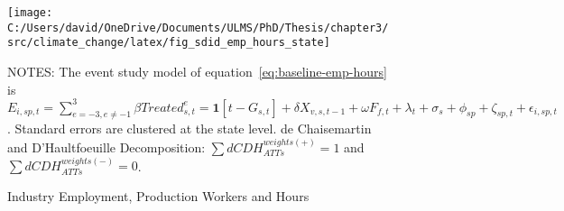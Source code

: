 \begin{figure}[H]
    \centering
    \texttt{[image: C:/Users/david/OneDrive/Documents/ULMS/PhD/Thesis/chapter3/src/climate\_change/latex/fig\_sdid\_emp\_hours\_state]}
    \caption{Industry Employment, Production Workers and Hours}
    \label{fig:state-baseline-employment-hours}
    \begin{minipage}{\columnwidth}
        \vspace{0.05in}
        \tiny NOTES: The event study model of equation~\ref{eq:baseline-emp-hours} is $E_{i,sp,t} = \sum_{{e = -3},{e \neq -1}}^{3} \beta Treated_{s,t}^e = \textbf{1}[t - G_{s,t}] + \delta X_{v,s,t-1} + \omega F_{f,t} + \lambda_{t} + \sigma_{s} + \phi_{sp} + \zeta_{sp,t} + \epsilon_{i,sp,t}$. Standard errors are clustered at the state level. de Chaisemartin and D'Haultfoeuille Decomposition: $\sum dCDH_{ATTs}^{weights(+)} = 1$ and $\sum dCDH_{ATTs}^{weights(-)} = 0$.
    \end{minipage}
\end{figure}